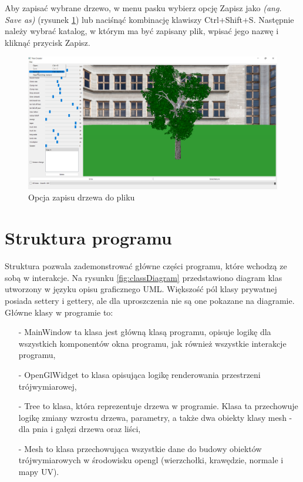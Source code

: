 \documentclass[a4paper,twoside,12pt]{report}
\begin{document}
Aby zapisać wybrane drzewo, w menu pasku wybierz opcję Zapisz 
jako \textit{(ang. Save as)} (rysunek \ref{fig:saveTree}) lub naciśnąć kombinację klawiszy Ctrl+Shift+S. 
Następnie należy wybrać katalog, w którym ma być zapisany plik, 
wpisać jego nazwę i kliknąć przycisk Zapisz.

\begin{figure}[H]
	\centering\includegraphics[width=15.5cm]{grafika/program/saveTree.png}
	\caption{Opcja zapisu drzewa do pliku}
    \label{fig:saveTree}
\end{figure}


\section{Struktura programu}

Struktura pozwala zademonstrować główne części programu, 
które wchodzą ze sobą w interakcje. Na rysunku \ref{fig:classDiagram} 
przedstawiono diagram klas utworzony w języku opisu graficznego UML. 
Większość pól klasy prywatnej posiada settery i gettery, 
ale dla uproszczenia nie są one pokazane na diagramie. 
Główne klasy w programie to:
\begin{itemize}
	\item[-] MainWindow ta klasa jest główną klasą programu, opisuje logikę dla wszystkich komponentów okna programu, jak również wszystkie interakcje programu,
	\item[-] OpenGlWidget to klasa opisująca logikę renderowania przestrzeni trójwymiarowej,
	\item[-] Tree to klasa, która reprezentuje drzewa w programie. Klasa ta przechowuje logikę zmiany wzrostu drzewa, parametry, a także dwa obiekty klasy mesh - dla pnia i gałęzi drzewa oraz liści,
	\item[-] Mesh to klasa przechowująca wszystkie dane do budowy obiektów trójwymiarowych w środowisku opengl (wierzchołki, krawędzie, normale i mapy UV).
\end{itemize}
\end{document}
